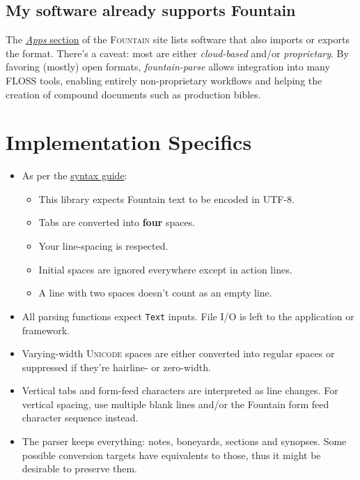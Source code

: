 \documentclass[11pt]{article}
\newcommand{\link}[2]{\underline{\color{darkblue}\href{#1}{#2}}}
\begin{document}
\subsection*{My software already supports Fountain}
The \link{https://fountain.io/apps/}{\emph{Apps} section} of the
\textsc{Fountain} site lists software that also imports or exports the
format. There's a caveat: most are either \emph{cloud-based} and/or
\emph{proprietary}. By favoring (mostly) open formats,
\emph{fountain-parse} allows integration into many \textsc{FLOSS} tools,
enabling entirely non-proprietary workflows and helping the creation of
compound documents such as production bibles.

\section*{Implementation Specifics}
  \begin{itemize}
    \item As per the \href{https://fountain.io/syntax/}{syntax guide}:
      \begin{itemize}
        \item This library expects Fountain text to be encoded in
          \textsc{UTF-8}.
        \item Tabs are converted into \textbf{four} spaces.
        \item Your line-spacing is respected.
        \item Initial spaces are ignored everywhere except in action
          lines.
        \item A line with two spaces doesn't count as an empty line.
      \end{itemize}
    \item All parsing functions expect \texttt{Text} inputs.  File I/O
      is left to the application or framework.
    \item Varying-width \textsc{Unicode} spaces are either converted
      into regular spaces or suppressed if they're hairline- or
      zero-width.
    \item Vertical tabs and form-feed characters are interpreted as line
      changes. For vertical spacing, use multiple blank lines and/or the
      Fountain form feed character sequence instead.
    \item The parser keeps everything: notes, boneyards, sections and
      synopses. Some possible conversion targets have equivalents to
      those, thus it might be desirable to preserve them.
  \end{itemize}
\end{document}
